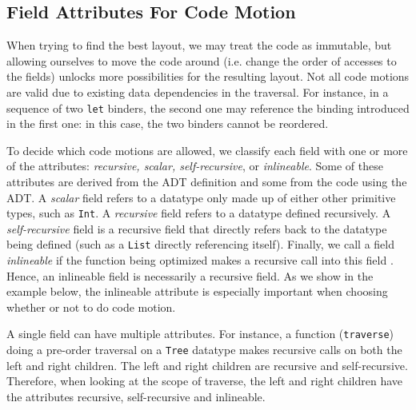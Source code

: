 \documentclass[acmsmall,review,anonymous]{acmart}\settopmatter{printfolios=true,printccs=false,printacmref=false}
\newcommand{\new}[1]{{\color{very-dark-green}{#1}}}
\newcommand{\new}[1]{#1}
\begin{document}
\subsection{Field Attributes For Code Motion}
\label{subsec:attributes}


When trying to find the best layout, we may treat the code as immutable,
but allowing ourselves to move the code around (i.e. change the order of accesses to the fields)
unlocks more possibilities for the resulting layout.
Not all code motions are valid due to existing data dependencies in the traversal.
For instance, in a sequence of two \lstinline|let| binders, the second one may reference the binding introduced in the first one: in this case, the two binders cannot be reordered.

To decide which code motions are allowed, we classify each field with one or more of the attributes: \textit{recursive, scalar, self-recursive}, or \textit{inlineable}.
Some of these attributes are derived from the ADT definition and some from the code using the ADT.
A \emph{scalar} field refers to a datatype only made up of either other primitive types, such as \lstinline|Int|.
A \emph{recursive} field refers to a datatype defined recursively.
A \emph{self-recursive} field is a recursive field that directly refers back to the datatype being defined (such as a \lstinline|List| directly referencing itself).
Finally, we call a field \emph{inlineable} if the function being optimized makes a recursive call into this field \new{(i.e.\ taking the field value as an argument)}.
Hence, an inlineable field is necessarily a recursive field.
As we show in the example below, the inlineable attribute is especially important when choosing whether or not to do code motion.


A single field can have multiple attributes.
For instance, a function (\lstinline|traverse|) doing a pre-order traversal on a \lstinline|Tree| datatype makes recursive calls on both the 
left and right children. The left and right children are recursive and self-recursive. Therefore, when looking at the scope of 
traverse, the left and right children have the attributes recursive, self-recursive and inlineable. 


\end{document}
